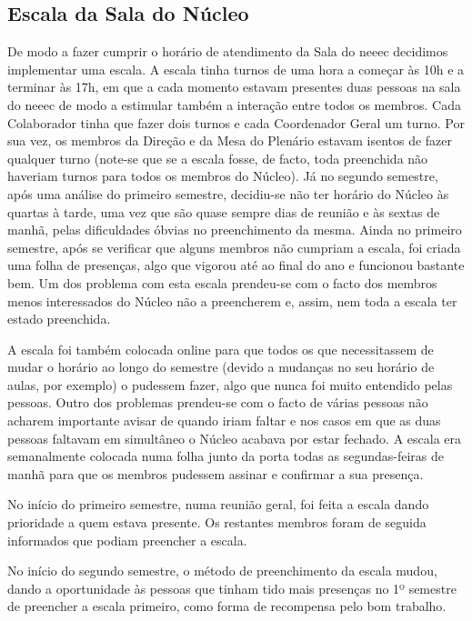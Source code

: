
\subsection{Escala da Sala do Núcleo}
\label{escalanucleo}

De modo a fazer cumprir o horário de atendimento da Sala do \acrshort{neeec} decidimos implementar uma escala. A escala tinha turnos de uma hora a começar às 10h e a terminar às 17h, em que a cada momento estavam presentes duas pessoas na sala do \acrshort{neeec} de modo a estimular também a interação entre todos os membros. Cada Colaborador tinha que fazer dois turnos e cada Coordenador Geral um turno. Por sua vez, os membros da Direção e da Mesa do Plenário estavam isentos de fazer qualquer turno (note-se que se a escala fosse, de facto, toda preenchida não haveriam turnos para todos os membros do Núcleo). Já no segundo semestre, após uma análise do primeiro semestre, decidiu-se não ter horário do Núcleo às quartas à tarde, uma vez que são quase sempre dias de reunião e às sextas de manhã, pelas dificuldades óbvias no preenchimento da mesma. Ainda no primeiro semestre, após se verificar que alguns membros não cumpriam a escala, foi criada uma folha de presenças, algo que vigorou até ao final do ano e funcionou bastante bem. Um dos problema com esta escala prendeu-se com o facto dos membros menos interessados do Núcleo não a preencherem e, assim, nem toda a escala ter estado preenchida. 

A escala foi também colocada online para que todos os que necessitassem de mudar o horário ao longo do semestre (devido a mudanças no seu horário de aulas, por exemplo) o pudessem fazer, algo que nunca foi muito entendido pelas pessoas. Outro dos problemas prendeu-se com o facto de várias pessoas não acharem importante avisar de quando iriam faltar e nos casos em que as duas pessoas faltavam em simultâneo o Núcleo acabava por estar fechado. A escala era semanalmente colocada numa folha junto da porta todas as segundas-feiras de manhã para que os membros pudessem assinar e confirmar a sua presença.

No início do primeiro semestre, numa reunião geral, foi feita a escala dando prioridade a quem estava presente. Os restantes membros foram de seguida informados que podiam preencher a escala. 

No início do segundo semestre, o método de preenchimento da escala mudou, dando a oportunidade às pessoas que tinham tido mais presenças no 1º semestre de preencher a escala primeiro, como forma de recompensa pelo bom trabalho.

